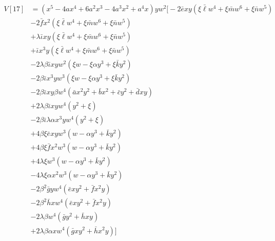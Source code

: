 \begin{align}
V[17] &= (x^5-4ax^4+6a^2x^3-4a^3x^2+a^4x) yw^2\biggl[-2\bar e x y (\xi\bar \ell w^4 + \xi\bar m w^6 + \xi\bar n w^5)\\
&-2 \bar f x^2 (\xi\bar \ell  w^4 + \xi\bar m  w^6 + \xi\bar n  w^5)\\
&+ \lambda \bar\iota x y(\xi\bar \ell  w^4 + \xi\bar m  w^6 + \xi\bar n  w^5)\\
&+ \bar\iota x^3y(\xi\bar \ell  w^4 + \xi\bar m  w^6 + \xi\bar n  w^5)\\
&-2\lambda\beta \bar \iota x yw^2 ( \xi  w - \xi \alpha y^3  + \xi \bar k y^2 ) \\
&-2\beta \bar \iota x^3y w^3 ( \xi  w - \xi \alpha y^3  + \xi \bar k y^2 ) \\
&- 2\beta \bar \iota x y\beta w^4 (\bar a x^2 y^2 + \bar b x^2 + \bar c y^2 + \bar d xy) \\
&+2\lambda\beta \bar \iota x y  w^4 (y^2  + \xi )\\
&- 2\beta \bar \iota \lambda \alpha x^3 y  w^4 (y^2  + \xi ) \\
& +4\beta\xi \bar e xyw^3(  w - \alpha y^3  + \bar k y^2 ) \\
& +4\beta\xi \bar f x^2 w^3(  w - \alpha y^3  + \bar k y^2 )  \\
&+4\lambda \xi w^3(  w - \alpha y^3  + \bar k y^2 ) \\
&- 4\lambda \xi \alpha 
x^2 w^3(  w - \alpha y^3  + \bar k y^2) \\
&-2\beta^2 \bar g y w^4(\bar e xy^2 + \bar f x^2 y) \\
&-2\beta^2 \bar h x w^4(\bar e xy^2 + \bar f x^2 y) \\
&-2 \lambda \beta w^4 (\bar g y^2 + \bar h x y) \\
&+ 2 \lambda \beta \alpha x w^4 (\bar g xy^2 + \bar h x^2 y)\biggr]
\end{align}

